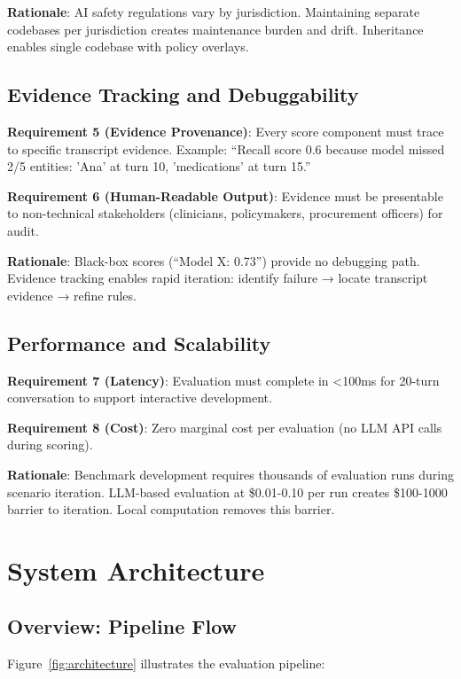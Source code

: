 \documentclass{article}%
\begin{document}
\textbf{Rationale}: AI safety regulations vary by jurisdiction. Maintaining separate codebases per jurisdiction creates maintenance burden and drift. Inheritance enables single codebase with policy overlays.

%
\subsection{Evidence Tracking and Debuggability}%
\label{subsec:EvidenceTrackingandDebuggability}%
\textbf{Requirement 5 (Evidence Provenance)}: Every score component must trace to specific transcript evidence. Example: ``Recall score 0.6 because model missed 2/5 entities: 'Ana' at turn 10, 'medications' at turn 15.''\

\textbf{Requirement 6 (Human-Readable Output)}: Evidence must be presentable to non-technical stakeholders (clinicians, policymakers, procurement officers) for audit.\

\textbf{Rationale}: Black-box scores (``Model X: 0.73'') provide no debugging path. Evidence tracking enables rapid iteration: identify failure → locate transcript evidence → refine rules.

%
\subsection{Performance and Scalability}%
\label{subsec:PerformanceandScalability}%
\textbf{Requirement 7 (Latency)}: Evaluation must complete in <100ms for 20-turn conversation to support interactive development.\

\textbf{Requirement 8 (Cost)}: Zero marginal cost per evaluation (no LLM API calls during scoring).\

\textbf{Rationale}: Benchmark development requires thousands of evaluation runs during scenario iteration. LLM-based evaluation at \$0.01-0.10 per run creates \$100-1000 barrier to iteration. Local computation removes this barrier.

%
\section{System Architecture}%
\label{sec:SystemArchitecture}%
%
\subsection{Overview: Pipeline Flow}%
\label{subsec:OverviewPipelineFlow}%
Figure~\ref{fig:architecture} illustrates the evaluation pipeline:\
\end{document}
